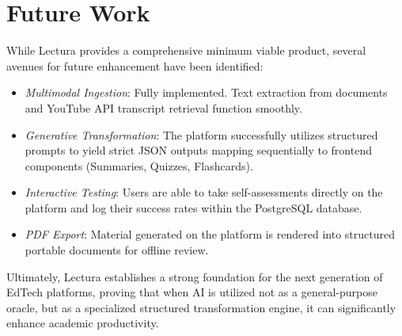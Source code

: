 \section*{Future Work}
While Lectura provides a comprehensive minimum viable product, several avenues for future enhancement have been identified:
\begin{itemize}[label=\textendash]
    \item \textit{Multimodal Ingestion}: Fully implemented. Text extraction from documents and YouTube API transcript retrieval function smoothly.
    \item \textit{Generative Transformation}: The platform successfully utilizes structured prompts to yield strict JSON outputs mapping sequentially to frontend components (Summaries, Quizzes, Flashcards).
    \item \textit{Interactive Testing}: Users are able to take self-assessments directly on the platform and log their success rates within the PostgreSQL database.
    \item \textit{PDF Export}: Material generated on the platform is rendered into structured portable documents for offline review.
\end{itemize}

Ultimately, Lectura establishes a strong foundation for the next generation of EdTech platforms, proving that when AI is utilized not as a general-purpose oracle, but as a specialized structured transformation engine, it can significantly enhance academic productivity.
